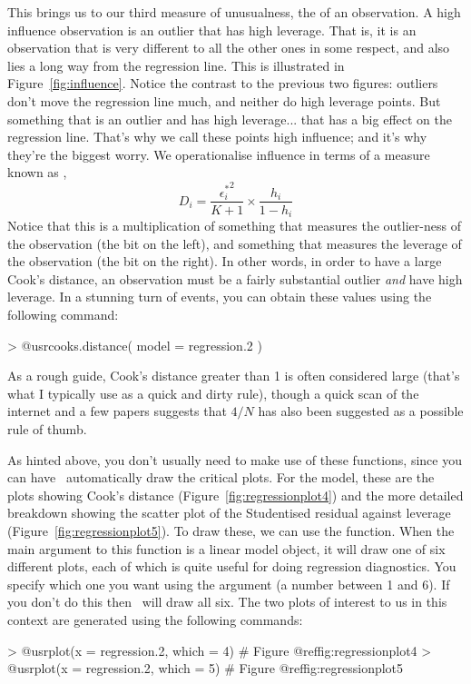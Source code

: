 This brings us to our third measure of unusualness, the  of an observation. A high influence observation is an outlier that has high leverage. That is, it is an observation that is very different to all the other ones in some respect, and also lies a long way from the regression line. This is illustrated in Figure~\ref{fig:influence}. Notice the contrast to the previous two figures: outliers don't move the regression line much, and neither do high leverage points. But something that is an outlier and has high leverage... that has a big effect on the regression line. That's why we call these points high influence; and it's why they're the biggest worry. We operationalise influence in terms of a measure known as , 
$$
D_i = \frac{{\epsilon_i^*}^2 }{K+1} \times \frac{h_i}{1-h_i}
$$ 
Notice that this is a multiplication of something that measures the outlier-ness of the observation (the bit on the left), and something that measures the leverage of the observation (the bit on the right). In other words, in order to have a large Cook's distance, an observation must be a fairly substantial outlier {\it and} have high leverage. In a stunning turn of events, you can obtain these values using the following command:
\begin{rblock1}
> @usr{cooks.distance( model = regression.2 )}
\end{rblock1}
As a rough guide, Cook's distance greater than 1 is often considered large (that's what I typically use as a quick and dirty rule), though a quick scan of the internet and a few papers suggests that $4/N$ has also been suggested as a possible rule of thumb. 

As hinted above, you don't usually need to make use of these functions, since you can have \R\ automatically draw the critical plots. For the  model, these are the plots showing Cook's distance (Figure~\ref{fig:regressionplot4}) and the more detailed breakdown showing the scatter plot of the Studentised residual against leverage (Figure~\ref{fig:regressionplot5}). To draw these, we can use the  function. When the main argument  to this function is a linear model object, it will draw one of six different plots, each of which is quite useful for doing regression diagnostics. You specify which one you want using the  argument (a number between 1 and 6). If you don't do this then \R\ will draw all six. The two plots of interest to us in this context are generated using the following commands:
\begin{rblock1}
> @usr{plot(x = regression.2, which = 4)}  # Figure @ref{fig:regressionplot4}
> @usr{plot(x = regression.2, which = 5)}  # Figure @ref{fig:regressionplot5}
\end{rblock1}

